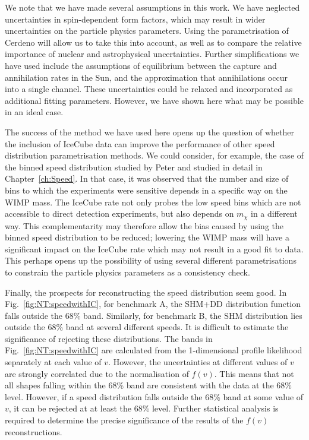 We note that we have made several assumptions in this work. We have neglected uncertainties in spin-dependent form factors, which may result in wider uncertainties on the particle physics parameters. Using the parametrisation of Cerdeno \etal \cite{Cerdeno:2012} will allow us to take this into account, as well as to compare the relative importance of nuclear and astrophysical uncertainties. Further simplifications we have used include the assumptions of equilibrium between the capture and annihilation rates in the Sun, and the approximation that annihilations occur into a single channel.  These uncertainties could be relaxed and incorporated as additional fitting parameters. However, we have shown here what may be possible in an ideal case.


The success of the method we have used here opens up the question of whether the inclusion of IceCube data can improve the performance of other speed distribution parametrisation methods. We could consider, for example, the case of the binned speed distribution studied by Peter \cite{Peter:2011} and studied in detail in Chapter~\ref{ch:Speed}. In that case, it was observed that the number and size of bins to which the experiments were sensitive depends in a specific way on the WIMP mass. The IceCube rate not only probes the low speed bins which are not accessible to direct detection experiments, but also depends on $m_\chi$ in a different way. This complementarity may therefore allow the bias caused by using the binned speed distribution to be reduced; lowering the WIMP mass will have a significant impact on the IceCube rate which may not result in a good fit to data. This perhaps opens up the possibility of using several different parametrisations to constrain the particle physics parameters as a consistency check.

Finally, the prospects for reconstructing the speed distribution seem good. In Fig.~\ref{fig:NT:speedwithIC}, for benchmark A, the SHM+DD distribution function falls outside the 68\% band. Similarly, for benchmark B, the SHM distribution lies outside the 68\% band at several different speeds. It is difficult to estimate the significance of rejecting these distributions. The bands in Fig.~\ref{fig:NT:speedwithIC} are calculated from the 1-dimensional profile likelihood separately at each value of $v$. However, the uncertainties at different values of $v$ are strongly correlated due to the normalisation of $f(v)$. This means that not all shapes falling within the 68\% band are consistent with the data at the 68\% level. However, if a speed distribution falls outside the 68\% band at some value of $v$, it can be rejected at at least the 68\% level. Further statistical analysis is required to determine the precise significance of the results of the $f(v)$ reconstructions.



